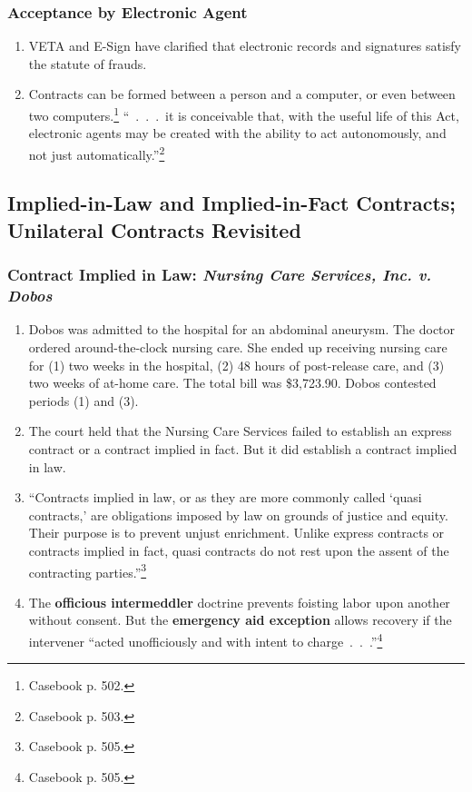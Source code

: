 \subsubsection{Acceptance by Electronic Agent}

\begin{enumerate}
    \item VETA and E-Sign have clarified that electronic records and 
    signatures satisfy the statute of frauds.
    \item Contracts can be formed between a person and a computer, or even 
    between two computers.\footnote{Casebook p. 502.} ``~.~.~.~it is 
    conceivable that, with the useful life of this Act, electronic agents may 
    be created with the ability to act autonomously, and not just 
    automatically.''\footnote{Casebook p. 503.}
\end{enumerate}

\subsection{Implied-in-Law and Implied-in-Fact Contracts; Unilateral Contracts 
Revisited}

\subsubsection{Contract Implied in Law: \emph{Nursing Care Services, Inc. v. 
Dobos}}

\begin{enumerate}
    \item Dobos was admitted to the hospital for an abdominal aneurysm. The 
    doctor ordered around-the-clock nursing care. She ended up receiving 
    nursing care for (1) two weeks in the hospital, (2) 48 hours of 
    post-release care, and (3) two weeks of at-home care. The total bill was 
    \$3,723.90. Dobos contested periods (1) and (3).
    \item The court held that the Nursing Care Services failed to establish an 
    express contract or a contract implied in fact. But it did establish a 
    contract implied in law.
    \item ``Contracts implied in law, or as they are more commonly called 
    `quasi contracts,' are obligations imposed by law on grounds of justice 
    and equity. Their purpose is to prevent unjust enrichment. Unlike express 
    contracts or contracts implied in fact, quasi contracts do not rest upon 
    the assent of the contracting parties.''\footnote{Casebook p. 505.}
    \item The \textbf{officious intermeddler} doctrine prevents foisting labor 
    upon another without consent. But the \textbf{emergency aid exception} 
    allows recovery if the intervener ``acted unofficiously and with intent to 
    charge~.~.~.''\footnote{Casebook p. 505.}
\end{enumerate}


